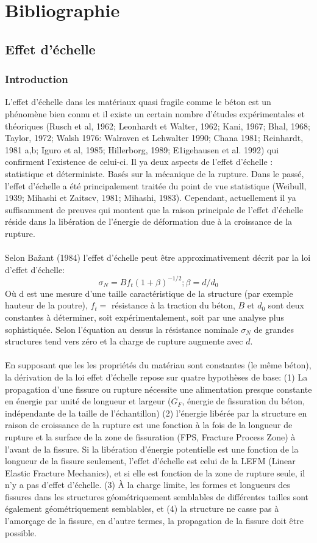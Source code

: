 \documentclass{DGC_M2_report}
\begin{document}
\part{Bibliographie}
\chapter{Effet d'échelle}
\section{Introduction}
L'effet d'échelle dans les matériaux quasi fragile comme le béton est un phénomène bien connu
et il existe un certain nombre d'études expérimentales et théoriques (Rusch et al, 1962; Leonhardt
et Walter, 1962; Kani, 1967; Bhal, 1968; Taylor, 1972; Walsh 1976: Walraven et Lehwalter
1990; Chana 1981; Reinhardt, 1981 a,b; Iguro et al, 1985; Hillerborg, 1989; E1igehausen et al.
1992) qui confirment l'existence de celui-ci. Il ya deux aspects de l'effet d'échelle : statistique et
déterministe. Basés sur la mécanique de la rupture. Dans le passé, l'effet d'échelle a été
principalement traitée du point de vue statistique (Weibull, 1939; Mihashi et Zaitscv, 1981;
Mihashi, 1983). Cependant, actuellement il ya suffisamment de preuves qui montent que la
raison principale de l'effet d'échelle réside dans la libération de l'énergie de déformation due à la
croissance de la rupture.\\\\
Selon Bažant (1984) l'effet d'échelle peut être approximativement décrit par la loi d'effet
d'échelle:\[\sigma_{N}=Bf_{t}(1+\beta)^{-1/2}  ; \beta=d/d_0\]
Où d est une mesure d'une taille caractéristique de la structure (par exemple hauteur de la
poutre), $f_t =$ résistance à la traction du béton, $B$ et $d_0$ sont deux constantes à déterminer, soit
expérimentalement, soit par une analyse plus sophistiquée. Selon l'équation au dessus la
résistance nominale $\sigma_N$ de grandes structures tend vers zéro et la charge de rupture augmente
avec $d$.\\\\
En supposant que les les propriétés du matériau sont constantes (le même béton), la
dérivation de la loi effet d'échelle repose sur quatre hypothèses de base: (1) La propagation d'une
fissure ou rupture nécessite une alimentation presque constante en énergie par unité de longueur
et largeur ($G_F$, énergie de fissuration du béton, indépendante de la taille de l'échantillon) (2)
l'énergie libérée par la structure en raison de croissance de la rupture est une fonction à la fois de
la longueur de rupture et la surface de la zone de fissuration (FPS, Fracture Process Zone) à
l'avant de la fissure. Si la libération d'énergie potentielle est une fonction de la longueur de la
fissure seulement, l'effet d'échelle est celui de la LEFM (Linear Elastic Fracture Mechanics), et
si elle est fonction de la zone de rupture seule, il n'y a pas d'effet d'échelle. (3) À la charge
limite, les formes et longueurs des fissures dans les structures géométriquement semblables de
différentes tailles sont également géométriquement semblables, et (4) la structure ne casse pas à
l'amorçage de la fissure, en d'autre termes, la propagation de la fissure doit être possible.
\end{document}
